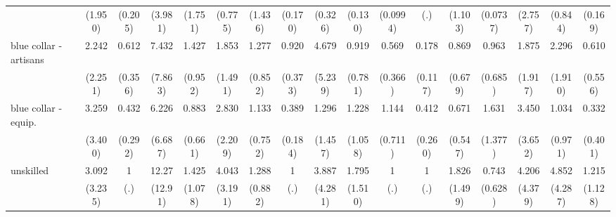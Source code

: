 {\begin{tabular}{l*{16}{c}}
                    &     (1.950)         &     (0.205)         &     (3.981)         &     (1.751)         &     (0.775)         &     (1.436)         &     (0.170)         &     (0.326)         &     (0.130)         &    (0.0994)         &         (.)         &     (1.103)         &    (0.0737)         &     (2.757)         &     (0.844)         &     (0.169)         \\
[1em]
blue collar - artisans&       2.242         &       0.612         &       7.432         &       1.427         &       1.853         &       1.277         &       0.920         &       4.679         &       0.919         &       0.569         &       0.178\sym{**} &       0.869         &       0.963         &       1.875         &       2.296         &       0.610         \\
                    &     (2.251)         &     (0.356)         &     (7.863)         &     (0.952)         &     (1.491)         &     (0.852)         &     (0.373)         &     (5.239)         &     (0.781)         &     (0.366)         &     (0.117)         &     (0.679)         &     (0.685)         &     (1.917)         &     (1.910)         &     (0.556)         \\
[1em]
blue collar - equip.&       3.259         &       0.432         &       6.226         &       0.883         &       2.830         &       1.133         &       0.389\sym{*}  &       1.296         &       1.228         &       1.144         &       0.412         &       0.671         &       1.631         &       3.450         &       1.034         &       0.332         \\
                    &     (3.400)         &     (0.292)         &     (6.687)         &     (0.661)         &     (2.209)         &     (0.752)         &     (0.184)         &     (1.457)         &     (1.058)         &     (0.711)         &     (0.260)         &     (0.547)         &     (1.377)         &     (3.652)         &     (0.971)         &     (0.401)         \\
[1em]
unskilled           &       3.092         &           1         &       12.27\sym{*}  &       1.425         &       4.043         &       1.288         &           1         &       3.887         &       1.795         &           1         &           1         &       1.826         &       0.743         &       4.206         &       4.852         &       1.215         \\
                    &     (3.235)         &         (.)         &     (12.91)         &     (1.078)         &     (3.191)         &     (0.882)         &         (.)         &     (4.281)         &     (1.510)         &         (.)         &         (.)         &     (1.499)         &     (0.628)         &     (4.379)         &     (4.287)         &     (1.128)         \\

\end{tabular}}

